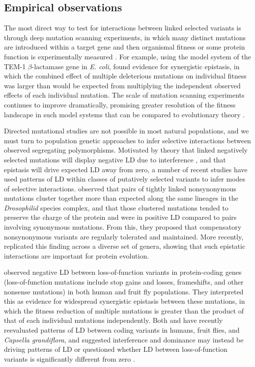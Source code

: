 \documentclass[]{article}
\begin{document}
\subsection{Empirical observations}\label{sec:empirical-observations}

The most direct way to test for interactions between linked selected variants
is through deep mutation scanning experiments, in which many distinct mutations
are introduced within a target gene and then organismal fitness or some protein
function is experimentally measured \citep{Romero2009-yi, Bank2015-vq,
Puchta2016-rx, Steinberg2016-is}. For example, using the model system of the
TEM-1 \(\beta\)-lactamase gene in \emph{E. coli}, \citet{Bershtein2006-bk}
found evidence for synergistic epistasis, in which the combined effect of
multiple deleterious mutations on individual fitness was larger than would be
expected from multiplying the independent observed effects of each individual
mutation. The scale of mutation scanning experiments continues to improve
dramatically, promising greater resolution of the fitness landscape in such
model systems that can be compared to evolutionary theory
\citep{Otwinowski2018-zk}.

Directed mutational studies are not possible in most natural populations, and
we must turn to population genetic approaches to infer selective interactions
between observed segregating polymorphisms. Motivated by theory that linked
negatively selected mutations will display negative LD due to interference
\citep{Hill1966-gv}, and that epistasis will drive expected LD away from zero,
a number of recent studies have used patterns of LD within classes of
putatively selected variants to infer modes of selective interactions.
\citet{Callahan2011-ac} observed that pairs of tightly linked nonsynonymous
mutations cluster together more than expected along the same lineages in the
\emph{Drosophilid} species complex, and that those clustered mutations tended
to preserve the charge of the protein and were in positive LD compared to pairs
involving synonymous mutations. From this, they proposed that compensatory
nonsynonymous variants are regularly tolerated and maintained. More recently,
\citet{Taverner2020-lk} replicated this finding across a diverse set of genera,
showing that such epistatic interactions are important for protein evolution.

\citet{Sohail2017-zq} observed negative LD between loss-of-function variants in
protein-coding genes (loss-of-function mutations include stop gains and losses,
frameshifts, and other nonsense mutations) in both human and fruit fly
populations. They interpreted this as evidence for widespread synergistic
epistasis between these mutations, in which the fitness reduction of multiple
mutations is greater than the product of that of each individual mutations
independently. Both \citet{Sandler2021-of} and \citet{Garcia2021-zn} have
recently reevaluated patterns of LD between coding variants in humans, fruit
flies, and \emph{Capsella grandiflora}, and suggested interference and
dominance may instead be driving patterns of LD \citep{Garcia2021-zn} or
questioned whether LD between loss-of-function variants is significantly
different from zero \citep{Sandler2021-of}.
\end{document}
